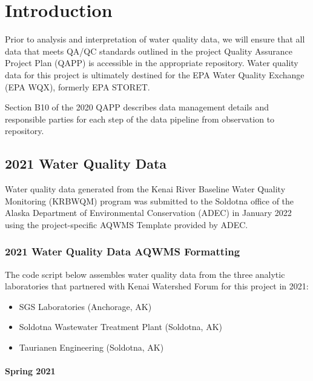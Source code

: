 \documentclass[
]{book}
\begin{document}
\hypertarget{introduction-1}{%
\section{Introduction}\label{introduction-1}}

Prior to analysis and interpretation of water quality data, we will ensure that all data that meets QA/QC standards outlined in the project Quality Assurance Project Plan (QAPP) \citep{kenaiwatershedforum2020} is accessible in the appropriate repository. Water quality data for this project is ultimately destined for the EPA Water Quality Exchange (EPA WQX), formerly EPA STORET.

Section B10 of the 2020 QAPP describes data management details and responsible parties for each step of the data pipeline from observation to repository.

\hypertarget{water-quality-data}{%
\subsection{2021 Water Quality Data}\label{water-quality-data}}

Water quality data generated from the Kenai River Baseline Water Quality Monitoring (KRBWQM) program was submitted to the Soldotna office of the Alaska Department of Environmental Conservation (ADEC) in January 2022 using the project-specific AQWMS Template provided by ADEC.

\hypertarget{water-quality-data-aqwms-formatting}{%
\subsubsection{2021 Water Quality Data AQWMS Formatting}\label{water-quality-data-aqwms-formatting}}

The code script below assembles water quality data from the three analytic laboratories that partnered with Kenai Watershed Forum for this project in 2021:

\begin{itemize}
\item
  SGS Laboratories (Anchorage, AK)
\item
  Soldotna Wastewater Treatment Plant (Soldotna, AK)
\item
  Taurianen Engineering (Soldotna, AK)
\end{itemize}

\hypertarget{spring-2021}{%
\paragraph{Spring 2021}\label{spring-2021}}
\end{document}
